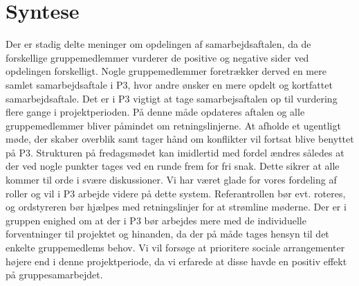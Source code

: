 \section{Syntese}
Der er stadig delte meninger om opdelingen af samarbejdsaftalen, da de forskellige gruppemedlemmer vurderer de positive og negative sider ved opdelingen forskelligt. Nogle gruppemedlemmer foretrækker derved en mere samlet samarbejdsaftale i P3, hvor andre ønsker en mere opdelt og kortfattet samarbejdsaftale.
Det er i P3 vigtigt at tage samarbejsaftalen op til vurdering flere gange i projektperioden. På denne måde opdateres aftalen og alle gruppemedlemmer bliver påmindet om retningslinjerne. 
At afholde et ugentligt møde, der skaber overblik samt tager hånd om konflikter vil fortsat blive benyttet på P3. Strukturen på fredagsmødet kan imidlertid med fordel ændres således at der ved nogle punkter tages ved en runde frem for fri snak. Dette sikrer at alle kommer til orde i svære diskussioner. 
Vi har været glade for vores fordeling af roller og vil i P3 arbejde videre på dette system. Referantrollen bør evt. roteres, og ordstyreren bør hjælpes med retningslinjer for at strømline møderne.
Der er i gruppen enighed om at der i P3 bør arbejdes mere med de individuelle forventninger til projektet og hinanden, da der på måde tages hensyn til det enkelte gruppemedlems behov. Vi vil forsøge at prioritere sociale arrangementer højere end i denne projektperiode, da vi erfarede at disse havde en positiv effekt på gruppesamarbejdet.  